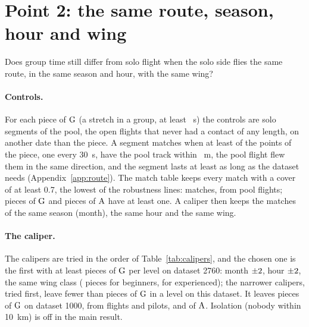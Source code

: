 \section{Point 2: the same route, season, hour and wing}\label{sec:matched}

Does group time still differ from solo flight when the solo side flies the same route, in the same season and hour, with the same wing?

\paragraph{Controls.} For each piece of $\G$ (a stretch in a group, at least \RawShortestOne~s) the controls are solo segments of the pool, the open flights
that never had a contact of any length, on another date than the piece. A segment matches when at least \MatCover{} of the points of the piece, one every 30~s, have the pool track within
\MatRho~m, the pool flight flew them in the same direction, and the segment lasts at least as long as the dataset needs (Appendix~\ref{app:route}). The match table keeps every match with a cover of at least 0.7, the lowest of the robustness lines: \MatMatches{} matches,
from \MatPool{} pool flights; \MatWithMatchG{} pieces of $\G$ and \MatWithMatchA{} pieces of $\A$ have at least one.
A caliper then keeps the matches of the same season (month), the same hour and the same wing.

\begin{table}
\centering\small

\caption{Pieces of $\G$ (dataset 1000 and 2760) and of $\A$: all of them (first row), and those with at least one control at cover \MatCover{} under each caliper, by level (beg. beginners, exp. experienced, wings A and B against C, D and CCC; a wing of another class has no level and leaves);
$\ast$ the chosen caliper. Month and hour are those of the middle of the piece and of the segment.}
\label{tab:calipers}
\end{table}

\paragraph{The caliper.} The calipers are tried in the order of Table~\ref{tab:calipers}, and the chosen one is the first with at least \MatMin{} pieces of $\G$ per level on dataset 2760: month
$\pm2$, hour $\pm2$, the same wing class (\MatMinBeg{} pieces for beginners, \MatMinExp{} for experienced); the narrower calipers, tried first, leave fewer than \MatMin{} pieces of $\G$ in a level on this dataset. It leaves \MatNGPieces{} pieces of $\G$ on dataset 1000, from \MatNGFlightsGSide{} flights and \MatNGPilotsGSide{} pilots, and \MatNAPieces{} of $\A$.
Isolation (nobody within 10~km) is off in the main result.

